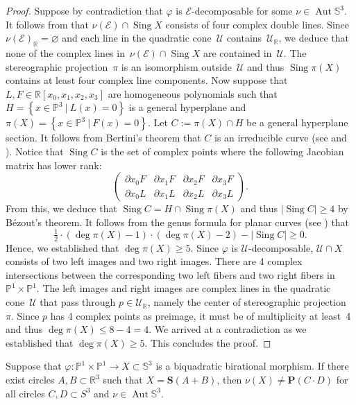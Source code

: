 \documentclass[11pt]{article}
\newcommand{\R}{\mathbb{R}}
\renewcommand{\P}{\mathbb{P}}
\renewcommand{\S}{\mathbb{S}}
\newcommand{\bP}{\mathbf{P}}
\newcommand{\bS}{\mathbf{S}}
\newcommand{\cE}{\mathcal{E}}
\newcommand{\cU}{\mathcal{U}}
\renewcommand{\c}{\colon}
\newcommand{\aut}{\operatorname{Aut}}
\newcommand{\set}[2]{\left\{#1 ~|~ #2\right\}}
\newcommand{\Sing}{\operatorname{Sing}}
\newcommand{\st}{such that }
\begin{document}
\begin{proof}
Suppose by contradiction that $\varphi$ is $\cE$-decomposable
for some $\nu\in\aut\S^3$.
It follows from  that
$\nu(\cE)\cap\Sing X$ consists of four complex double lines.
Since $\nu(\cE)_\R=\varnothing$ and each line in the quadratic cone~$\cU$ contains~$\cU_\R$,
we deduce that none of the complex lines in~$\nu(\cE)\cap\Sing X$ are contained in~$\cU$.
The stereographic projection~$\pi$ is an isomorphism outside~$\cU$
and thus $\Sing\pi(X)$ contains at least four complex line components.
Now suppose that $L,F\in \R[x_0,x_1,x_2,x_3]$ are homogeneous polynomials \st
$H=\set{x\in \P^3}{L(x)=0}$ is a general hyperplane
and
$\pi(X)=\set{x\in \P^3}{F(x)=0}$.
Let $C:=\pi(X)\cap H$ be a general hyperplane section.
It follows from Bertini's theorem that $C$ is an irreducible curve
(see \citep[Corollary~III.10.9, Remark~10.9.1]{1977} and \citep[Theorem~2.16]{2007}).
Notice that $\Sing C$ is the set of complex points
where the following Jacobian matrix has lower rank:
\[
\left(
\begin{smallmatrix}
\partial{x_0}F & \partial{x_1}F & \partial{x_2}F & \partial{x_3}F\\
\partial{x_0}L & \partial{x_1}L & \partial{x_2}L & \partial{x_3}L
\end{smallmatrix}
\right).
\]
From this, we deduce that $\Sing C=H\cap \Sing\pi(X)$
and thus $|\Sing C|\geq 4$ by B\'ezout's theorem.
It follows from the genus formula for planar curves (see \citep[Exercises~I.7.2b and IV.1.8a]{1977}) that
\[
\tfrac{1}{2}\cdot(\deg\pi(X)-1)\cdot(\deg\pi(X)-2) - |\Sing C|\geq 0.
\]
Hence, we established that $\deg\pi(X)\geq 5$.
Since $\varphi$ is $\cU$-decomposable, $\cU\cap X$
consists of two left images and two right images.
There are 4 complex intersections
between the corresponding two left fibers and two right fibers in~$\P^1\times\P^1$.
The
left images and right images are complex lines in the quadratic cone~$\cU$
that pass through $p\in\cU_\R$, namely the center of stereographic projection~$\pi$.
Since $p$ has 4 complex points as preimage,
it must be of multiplicity at least~4 and thus $\deg \pi(X)\leq 8-4=4$.
We arrived at a contradiction as we established that $\deg\pi(X)\geq 5$.
This concludes the proof.
\end{proof}

\begin{proposition}
\label{prp:ABCD}
Suppose that $\varphi\c\P^1\times\P^1\to X\subset \S^3$ is a biquadratic birational morphism.
If there exist circles $A,B\subset\R^3$ \st $X=\bS(A+B)$,
then $\nu(X)\neq\bP(C\cdot D)$ for all circles $C,D\subset S^3$ and $\nu\in\aut\S^3$.
\end{proposition}
\end{document}
